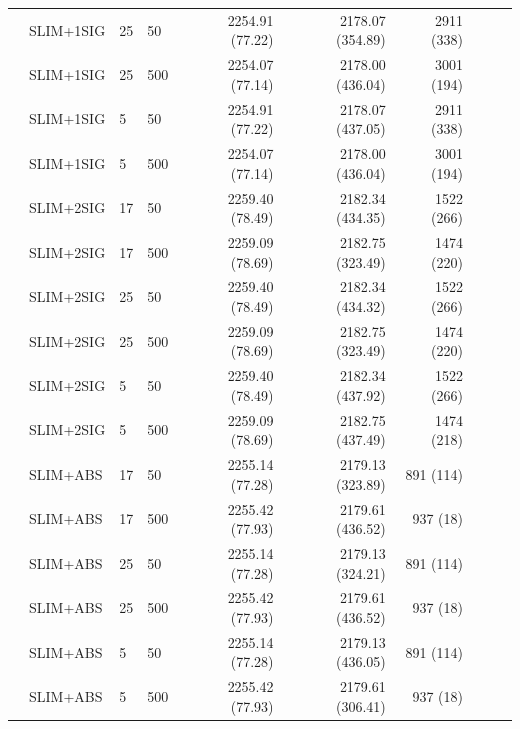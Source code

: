 \begin{longtable}{llllrrrrrr}
 & SLIM+1SIG & 25 & 50 & 2254.91 (77.22) & 2178.07 (354.89) & 2911 (338) \\
 & SLIM+1SIG & 25 & 500 & 2254.07 (77.14) & 2178.00 (436.04) & 3001 (194) \\
 & SLIM+1SIG & 5 & 50 & 2254.91 (77.22) & 2178.07 (437.05) & 2911 (338) \\
 & SLIM+1SIG & 5 & 500 & 2254.07 (77.14) & 2178.00 (436.04) & 3001 (194) \\
 & SLIM+2SIG & 17 & 50 & 2259.40 (78.49) & 2182.34 (434.35) & 1522 (266) \\
 & SLIM+2SIG & 17 & 500 & 2259.09 (78.69) & 2182.75 (323.49) & 1474 (220) \\
 & SLIM+2SIG & 25 & 50 & 2259.40 (78.49) & 2182.34 (434.32) & 1522 (266) \\
 & SLIM+2SIG & 25 & 500 & 2259.09 (78.69) & 2182.75 (323.49) & 1474 (220) \\
 & SLIM+2SIG & 5 & 50 & 2259.40 (78.49) & 2182.34 (437.92) & 1522 (266) \\
 & SLIM+2SIG & 5 & 500 & 2259.09 (78.69) & 2182.75 (437.49) & 1474 (218) \\
 & SLIM+ABS & 17 & 50 & 2255.14 (77.28) & 2179.13 (323.89) & 891 (114) \\
 & SLIM+ABS & 17 & 500 & 2255.42 (77.93) & 2179.61 (436.52) & 937 (18) \\
 & SLIM+ABS & 25 & 50 & 2255.14 (77.28) & 2179.13 (324.21) & 891 (114) \\
 & SLIM+ABS & 25 & 500 & 2255.42 (77.93) & 2179.61 (436.52) & 937 (18) \\
 & SLIM+ABS & 5 & 50 & 2255.14 (77.28) & 2179.13 (436.05) & 891 (114) \\
 & SLIM+ABS & 5 & 500 & 2255.42 (77.93) & 2179.61 (306.41) & 937 (18) \\
\end{longtable}